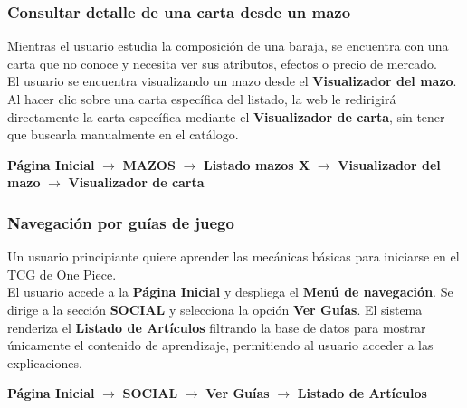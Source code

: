 \documentclass[10pt]{article}
\begin{document}
		\subsubsection{Consultar detalle de una carta desde un mazo}
		Mientras el usuario estudia la composición de una baraja, se encuentra con una carta que no conoce y necesita ver sus atributos, efectos o precio de mercado.\\
		El usuario se encuentra visualizando un mazo desde el \textbf{Visualizador del mazo}. Al hacer clic sobre una carta específica del listado, la web le redirigirá directamente la carta específica mediante el \textbf{Visualizador de carta}, sin tener que buscarla manualmente en el catálogo.
		\begin{center}
			\textbf{Página Inicial} $\rightarrow$ \textbf{MAZOS} $\rightarrow$ \textbf{Listado mazos X} $\rightarrow$ \textbf{Visualizador del mazo} $\rightarrow$ \textbf{Visualizador de carta}
		\end{center}
		
		\subsubsection{Navegación por guías de juego}
		Un usuario principiante quiere aprender las mecánicas básicas para iniciarse en el TCG de One Piece.\\
		El usuario accede a la \textbf{Página Inicial} y despliega el \textbf{Menú de navegación}. Se dirige a la sección \textbf{SOCIAL} y selecciona la opción \textbf{Ver Guías}. El sistema renderiza el \textbf{Listado de Artículos} filtrando la base de datos para mostrar únicamente el contenido de aprendizaje, permitiendo al usuario acceder a las explicaciones.
		\begin{center}
			\textbf{Página Inicial} $\rightarrow$ \textbf{SOCIAL} $\rightarrow$ \textbf{Ver Guías} $\rightarrow$ \textbf{Listado de Artículos}
		\end{center}
    
		
		
	
\end{document}
